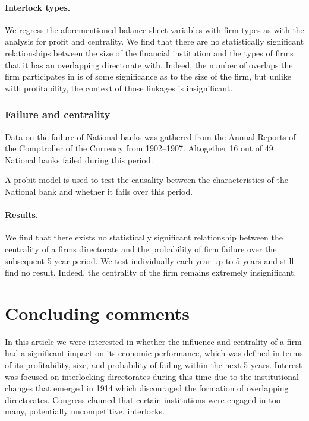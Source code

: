 \documentclass[11pt,fleqn]{article}
\begin{document}
\paragraph{Interlock types.}

We regress the aforementioned balance-sheet variables with firm types as with the analysis for profit and centrality. We find that there are no statistically significant relationships between the size of the financial institution and the types of firms that it has an overlapping directorate with. Indeed, the number of overlaps the firm participates in is of some significance as to the size of the firm, but unlike with profitability, the context of those linkages is insignificant.

\subsubsection*{Failure and centrality}

Data on the failure of National banks was gathered from the Annual Reports of the Comptroller of the Currency from 1902--1907. Altogether 16 out of 49 National banks failed during this period.

A probit model is used to test the causality between the characteristics of the National bank and whether it fails over this period.

\paragraph{Results.} We find that there exists no statistically significant relationship between the centrality of a firms directorate and the probability of firm failure over the subsequent 5 year period. We test individually each year up to 5 years and still find no result. Indeed, the centrality of the firm remains extremely insignificant.

\section{Concluding comments}

In this article we were interested in whether the influence and centrality of a firm had a significant impact on its economic performance, which was defined in terms of its profitability, size, and probability of failing within the next 5 years. Interest was focused on interlocking directorates during this time due to the institutional changes that emerged in 1914 which discouraged the formation of overlapping directorates. Congress claimed that certain institutions were engaged in too many, potentially uncompetitive, interlocks.
\end{document}
